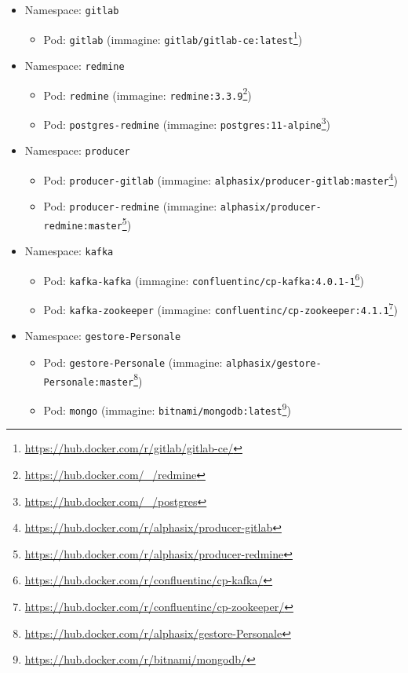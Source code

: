 \begin{itemize}
	\item Namespace: \texttt{gitlab}
	\begin{itemize}
		\item Pod: \texttt{gitlab} (immagine: \texttt{gitlab/gitlab-ce:latest}\footnote{\url{https://hub.docker.com/r/gitlab/gitlab-ce/}})%
	\end{itemize}
	
	\item Namespace: \texttt{redmine}
	\begin{itemize}
		\item Pod: \texttt{redmine} (immagine: \texttt{redmine:3.3.9}\footnote{\url{https://hub.docker.com/_/redmine}})
		\item Pod: \texttt{postgres-redmine} (immagine: \texttt{postgres:11-alpine}\footnote{\url{https://hub.docker.com/_/postgres}})
	\end{itemize}
	
	\item Namespace: \texttt{producer}
	\begin{itemize}
		\item Pod: \texttt{producer-gitlab} (immagine: \texttt{alphasix/producer-gitlab:master}\footnote{\url{https://hub.docker.com/r/alphasix/producer-gitlab}})
		\item Pod: \texttt{producer-redmine} (immagine: \texttt{alphasix/producer-redmine:master}\footnote{\url{https://hub.docker.com/r/alphasix/producer-redmine}})
	\end{itemize}
	
	\item Namespace: \texttt{kafka}
	\begin{itemize}
		\item Pod: \texttt{kafka-kafka} (immagine: \texttt{confluentinc/cp-kafka:4.0.1-1}\footnote{\url{https://hub.docker.com/r/confluentinc/cp-kafka/}})
		\item Pod: \texttt{kafka-zookeeper} (immagine: \texttt{confluentinc/cp-zookeeper:4.1.1}\footnote{\url{https://hub.docker.com/r/confluentinc/cp-zookeeper/}})
	\end{itemize}
	
	\item Namespace: \texttt{gestore-Personale}
	\begin{itemize}
		\item Pod: \texttt{gestore-Personale} (immagine: \texttt{alphasix/gestore-Personale:master}\footnote{\url{https://hub.docker.com/r/alphasix/gestore-Personale}})
		\item Pod: \texttt{mongo} (immagine: \texttt{bitnami/mongodb:latest}\footnote{\url{https://hub.docker.com/r/bitnami/mongodb/}})
	\end{itemize}
	

\end{itemize}
